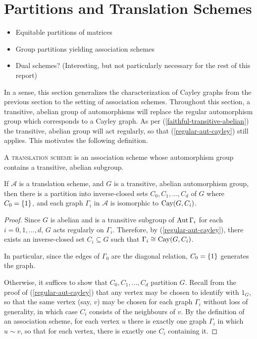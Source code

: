 \documentclass{report}
\newcommand{\AS}{\mathcal{A}}
\begin{document}
  \section{Partitions and Translation Schemes}
    \begin{itemize}
      \item Equitable partitions of matrices
      \item Group partitions yielding association schemes
      \item Dual schemes? (Interesting, but not particularly necessary for the
        rest of this report)
    \end{itemize}

    In a sense, this section generalizes the characterization of Cayley graphs
    from the previous section to the setting of association schemes.
    Throughout this section, a transitive, abelian group of automorphisms will
    replace the regular automorphism group which corresponds to a Cayley graph.
    As per (\ref{faithful-transitive-abelian}) the transitive, abelian group
    will act regularly, so that (\ref{regular-aut-cayley}) still applies.
    This motivates the following definition.

    \begin{defn}\label{translation-scheme}
      A \textsc{translation scheme} is an association scheme whose
      automorphism group contains a transitive, abelian subgroup.
    \end{defn}

    \begin{lem}\label{translation-partition}
      If $\AS$ is a translation scheme,
      and $G$ is a transitive, abelian automorphism group,
      then there is a partition into inverse-closed sets
      $C_0, C_1, \ldots, C_d$ of $G$ where $C_0 = \left\lbrace 1 \right\rbrace$,
      and each graph $\Gamma_i$ in $\AS$ is isomorphic to $\operatorname{Cay}(G, C_i)$.
    \end{lem}

    \begin{proof}
      Since $G$ is abelian and is a transitive subgroup of $\operatorname{Aut} \Gamma_i$ for
      each $i = 0, 1, \ldots, d$, $G$ acts regularly on $\Gamma_i$.
      Therefore, by (\ref{regular-aut-cayley}), there exists an inverse-closed
      set $C_i \subseteq G$ such that $\Gamma_i \cong \operatorname{Cay}(G, C_i)$.

      In particular, since the edges of $\Gamma_0$ are the diagonal relation,
      $C_0 = \left\lbrace 1 \right\rbrace$ generates the graph.

      Otherwise, it suffices to show that $C_0, C_1, \ldots, C_d$ partition $G$.
      Recall from the proof of (\ref{regular-aut-cayley}) that any vertex may be
      chosen to identify with $1_G$, so that the same vertex (say, $v$)
      may be chosen for each graph $\Gamma_i$ without loss of generality,
      in which case $C_i$ consists of the neighbours of $v$.  By the definition
      of an association scheme, for each vertex $u$ there is exactly one
      graph $\Gamma_i$ in which $u \sim v$, so that for each vertex, there is
      exactly one $C_i$ containing it.
    \end{proof}
\end{document}
